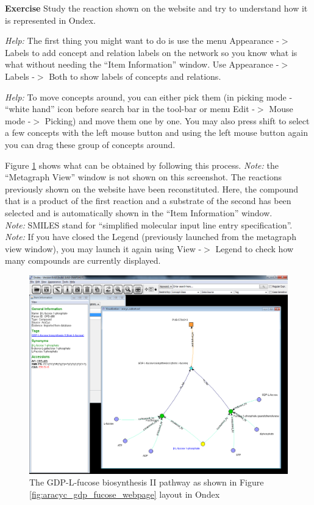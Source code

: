\vspace{0.5cm}
\exerciserule
\textbf{Exercise }
Study the reaction shown on the website and try to understand how it is represented in Ondex.

\emph{Help:} The first thing you might want to do is use the menu Appearance -$>$ Labels to add concept and relation labels 
on the network so you know what is what without needing the ``Item Information'' window. Use
Appearance -$>$ Labels -$>$ Both to show labels of concepts and relations.

\emph{Help:} To move concepts around, you can either pick them (in picking mode - ``white hand'' icon before search bar in the tool-bar or menu Edit -$>$ Mouse mode -$>$ Picking) and move them one by one.
You may also press shift to select a few concepts with the left mouse button and
using the left mouse button again you can drag these group of concepts around.

Figure \ref{fig:aracyc_gdp_fucose_sorted} shows what can be obtained by following this process. 
\emph{Note:} the ``Metagraph View'' window is not shown on this screenshot.
The reactions previously shown on the website have been reconstituted. 
Here, the compound that is a product of the first reaction and a substrate of the second has been selected and is automatically shown in the ``Item Information'' window.\\ 
\emph{Note:} SMILES stand for ``simplified molecular input line entry specification''.\\
\emph{Note:} If you have closed the Legend (previously launched from the metagraph view window), you may launch it again using View -$>$ Legend to check how many compounds are currently displayed.
\begin{figure}[H]
\centering
\includegraphics[scale=0.3]{images/Jun12/aracyc_gdp_fucose_sorted.png} 
\caption{The GDP-L-fucose biosynthesis II pathway as shown in Figure \ref{fig:aracyc_gdp_fucose_webpage} layout in Ondex}
\label{fig:aracyc_gdp_fucose_sorted}
\end{figure}
\exerciserule

